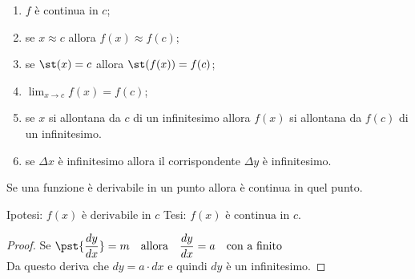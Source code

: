 \begin{enumerate}[noitemsep]
 \item \(f\) è continua in \(c\);
 \item se \(x \approx c\) allora \(f(x) \approx f(c)\);
 \item se \(\st(x) = c\) allora \(\st(f(x)) = f(c)\);
 \item \(\lim_{x \to c} f(x) = f(c)\);
 \item se \(x\) si allontana da \(c\) di un infinitesimo allora 
   \(f(x)\) si allontana da \(f(c)\) di un infinitesimo.
 \item se \(\Delta x\) è infinitesimo allora il corrispondente \(\Delta y\) 
   è infinitesimo.
\end{enumerate}

\begin{teorema}
Se una funzione è derivabile in un punto allora è continua in quel punto.
\end{teorema}

\noindent Ipotesi: 
\(f(x) \text{ è derivabile in } c\)
\tab Tesi: 
\(f(x) \text{ è continua in } c\).

\begin{proof}

Se \(\pst{\dfrac{dy}{dx}}=m \quad \text{allora} \quad 
\dfrac{dy}{dx}=a \quad \text{con a finito} \)\\
Da questo deriva che \(dy= a \cdot dx\) e quindi \(dy\) è un infinitesimo.
\end{proof}


